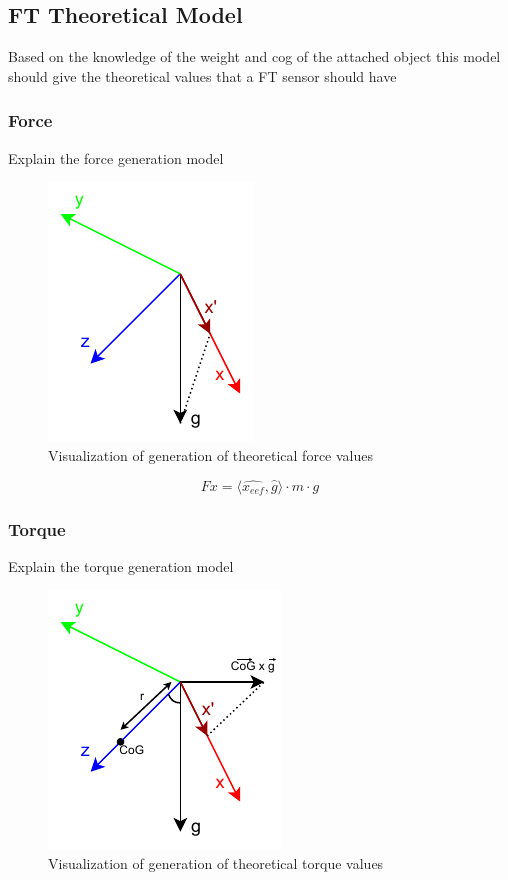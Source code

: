 \subsection{FT Theoretical Model}

\par Based on the knowledge of the weight and cog of the attached object this model should give the theoretical values that a FT sensor should have

\subsubsection{Force}

\par Explain the force generation model

\begin{figure}[h]
    \centering
    \includegraphics[width=0.3\linewidth]{figs/chp3/ft_theory_force.pdf}
    \caption{Visualization of generation of theoretical force values}
    \label{fig:ft_theory_force}
\end{figure}

\[ Fx = \langle \hat{x_{eef}} , \hat{g} \rangle \cdot m \cdot g \]

\subsubsection{Torque}

\par Explain the torque generation model

\begin{figure}[h]
    \centering
    \includegraphics[width=0.35\linewidth]{figs/chp3/ft_theory_torque.pdf}
    \caption{Visualization of generation of theoretical torque values}
    \label{fig:ft_theory_torque}
\end{figure}

